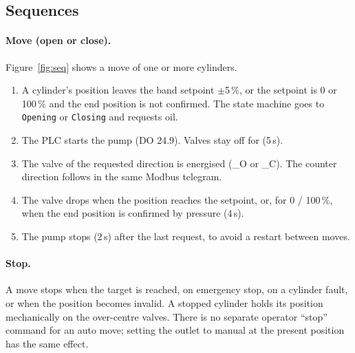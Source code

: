 \documentclass[11pt,a4paper]{article}
\begin{document}
\subsection{Sequences}
\paragraph{Move (open or close).} Figure~\ref{fig:seq} shows a move of one or more cylinders.
\begin{enumerate}[nosep]
  \item A cylinder's position leaves the band setpoint $\pm$5\,\%, or the setpoint is 0 or
        100\,\% and the end position is not confirmed. The state machine goes to
        \texttt{Opening} or \texttt{Closing} and requests oil.
  \item The PLC starts the pump (DO 24.9). Valves stay off for  (5\,s).
  \item The valve of the requested direction is energised (\_O or \_C). The counter
        direction follows in the same Modbus telegram.
  \item The valve drops when the position reaches the setpoint, or, for 0 / 100\,\%, when the end
        position is confirmed by pressure (4\,s).
  \item The pump stops  (2\,s) after the last request, to avoid a restart
        between moves.
\end{enumerate}

\paragraph{Stop.} A move stops when the target is reached, on emergency stop, on a cylinder fault,
or when the position becomes invalid. A stopped cylinder holds its position mechanically on the
over-centre valves. There is no separate operator ``stop'' command for an auto move; setting the
outlet to manual at the present position has the same effect.
\end{document}
